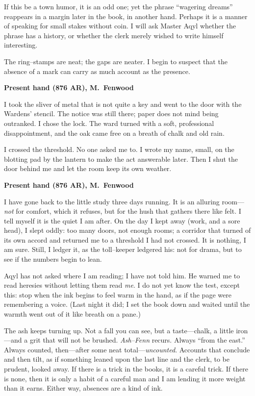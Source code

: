 \documentclass[11pt]{article}
\begin{document}
If this be a town humor, it is an odd one; yet the phrase “wagering dreams” reappears in a margin later in the book, in another hand. Perhaps it is a manner of speaking for small stakes without coin. I will ask Master Aqyl whether the phrase has a history, or whether the clerk merely wished to write himself interesting.

The ring–stamps are neat; the gaps are neater. I begin to suspect that the absence of a mark can carry as much account as the presence.

\medskip

\noindent\textbf{Present hand (876 AR), M.\ Fenwood}

I took the sliver of metal that is not quite a key and went to the door with the Wardens’ stencil. The notice was still there; paper does not mind being outranked. I chose the lock. The ward turned with a soft, professional disappointment, and the oak came free on a breath of chalk and old rain.

I crossed the threshold. No one asked me to. I wrote my name, small, on the blotting pad by the lantern to make the act answerable later. Then I shut the door behind me and let the room keep its own weather.

\medskip
\noindent\textbf{Present hand (876 AR), M.\ Fenwood}

I have gone back to the little study three days running. It is an alluring room—\emph{not} for comfort, which it refuses, but for the hush that gathers there like felt. I tell myself it is the quiet I am after. On the day I kept away (work, and a sore head), I slept oddly: too many doors, not enough rooms; a corridor that turned of its own accord and returned me to a threshold I had not crossed. It is nothing, I am sure. Still, I ledger it, as the toll–keeper ledgered his: not for drama, but to see if the numbers begin to lean.

Aqyl has not asked where I am reading; I have not told him. He warned me to read heresies without letting them read \emph{me}. I do not yet know the test, except this: stop when the ink begins to feel warm in the hand, as if the page were remembering a voice. (Last night it did; I set the book down and waited until the warmth went out of it like breath on a pane.)

The ash keeps turning up. Not a fall you can see, but a taste—chalk, a little iron—and a grit that will not be brushed. \textit{Ash–Fenn} recurs. Always “from the east.” Always counted, then—after some neat total—\emph{uncounted}. Accounts that conclude and then tilt, as if something leaned upon the last line and the clerk, to be prudent, looked away. If there is a trick in the books, it is a careful trick. If there is none, then it is only a habit of a careful man and I am lending it more weight than it earns. Either way, absences are a kind of ink.
\end{document}
